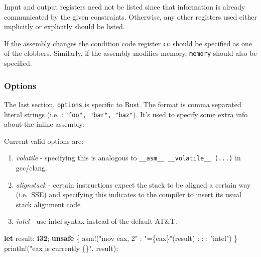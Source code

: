 \documentclass[a4paper,]{book}
\newenvironment{Shaded}{\begin{snugshade}}{\end{snugshade}}
\newcommand{\KeywordTok}[1]{\textcolor[rgb]{0.13,0.29,0.53}{\textbf{{#1}}}}
\newcommand{\StringTok}[1]{\textcolor[rgb]{0.31,0.60,0.02}{{#1}}}
\newcommand{\CommentTok}[1]{\textcolor[rgb]{0.56,0.35,0.01}{\textit{{#1}}}}
\newcommand{\OtherTok}[1]{\textcolor[rgb]{0.56,0.35,0.01}{{#1}}}
\newcommand{\NormalTok}[1]{{#1}}
\begin{document}
\begin{Shaded}
\end{Shaded}

Input and output registers need not be listed since that information is
already communicated by the given constraints. Otherwise, any other
registers used either implicitly or explicitly should be listed.

If the assembly changes the condition code register \texttt{cc} should
be specified as one of the clobbers. Similarly, if the assembly modifies
memory, \texttt{memory} should also be specified.

\subsubsection{Options}\label{options}

The last section, \texttt{options} is specific to Rust. The format is
comma separated literal strings (i.e. \texttt{:"foo",\ "bar",\ "baz"}).
It's used to specify some extra info about the inline assembly:

Current valid options are:

\begin{enumerate}
\def\labelenumi{\arabic{enumi}.}
\itemsep1pt\parskip0pt
\item
  \emph{volatile} - specifying this is analogous to
  \texttt{\_\_asm\_\_\ \_\_volatile\_\_\ (...)} in gcc/clang.
\item
  \emph{alignstack} - certain instructions expect the stack to be
  aligned a certain way (i.e.~SSE) and specifying this indicates to the
  compiler to insert its usual stack alignment code
\item
  \emph{intel} - use intel syntax instead of the default AT\&T.
\end{enumerate}

\begin{Shaded}
\begin{Highlighting}[]
\KeywordTok{let} \NormalTok{result: }\KeywordTok{i32}\NormalTok{;}
\KeywordTok{unsafe} \NormalTok{\{}
   \OtherTok{asm!}\NormalTok{(}\StringTok{"mov eax, 2"} \NormalTok{: }\StringTok{"=\{eax\}"}\NormalTok{(result) : : : }\StringTok{"intel"}\NormalTok{)}
\NormalTok{\}}
\OtherTok{println!}\NormalTok{(}\StringTok{"eax is currently \{\}"}\NormalTok{, result);}
\end{Highlighting}
\end{Shaded}
\end{document}
